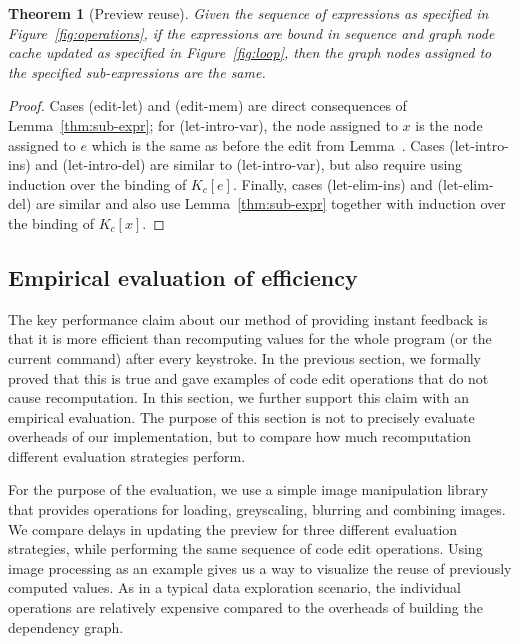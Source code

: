 \documentclass[english,submission]{programming}
\newcounter{thc}
\theoremstyle{plain}
\newtheorem{theorem}[thc]{Theorem}
\theoremstyle{definition}
\newcommand{\rname}[1]{{\sffamily(#1)}}
\begin{document}
\begin{theorem}[Preview reuse]
\label{thm:preview-reuse}
Given the sequence of expressions as specified in Figure~\ref{fig:operations}, if the expressions
are bound in sequence and graph node cache updated as specified in Figure~\ref{fig:loop}, then
the graph nodes assigned to the specified sub-expressions are the same.
\end{theorem}
\begin{proof}
Cases \rname{edit-let} and \rname{edit-mem} are direct consequences of Lemma~\ref{thm:sub-expr};
for \rname{let-intro-var}, the node assigned to $x$ is the node assigned to $e$ which is the
same as before the edit from Lemma~.
Cases \rname{let-intro-ins} and \rname{let-intro-del} are similar to \rname{let-intro-var}, but
also require using induction over the binding of $K_c[e]$. Finally, cases \rname{let-elim-ins}
and \rname{let-elim-del} are similar and also use Lemma~\ref{thm:sub-expr}
together with induction over the binding of $K_c[x]$.
\end{proof}


\subsection{Empirical evaluation of efficiency}
\label{sec:evaluation-empirical}

The key performance claim about our method of providing instant feedback is that it is more
efficient than recomputing values for the whole program (or the current command) after every
keystroke. In the previous section, we formally proved that this is true and gave examples of
code edit operations that do not cause recomputation. In this section, we further support this
claim with an empirical evaluation. The purpose of this section is not to precisely evaluate
overheads of our implementation, but to compare how much recomputation different evaluation
strategies perform.

For the purpose of the evaluation, we use a simple image manipulation library that provides
operations for loading, greyscaling, blurring and combining images. We compare delays in
updating the preview for three different evaluation strategies, while performing the same
sequence of code edit operations. Using image processing as an example gives us a way to
visualize the reuse of previously computed values. As in a typical data exploration scenario,
the individual operations are relatively expensive compared to the overheads of building the
dependency graph.
\end{document}
